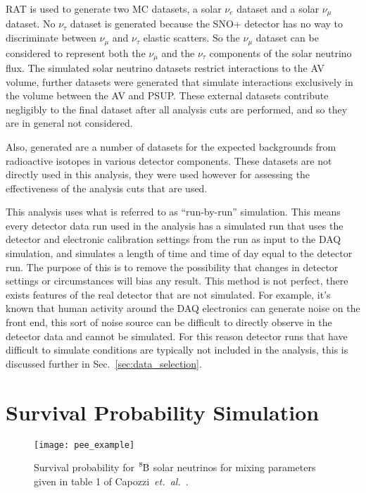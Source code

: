 RAT is used to generate two MC datasets, a solar $\nu_{e}$ dataset
and a solar $\nu_{\mu}$ dataset.
No $\nu_{\tau}$ dataset is generated because the SNO+ detector has
no way to discriminate between $\nu_{\mu}$ and $\nu_{\tau}$ elastic scatters.
So the $\nu_{\mu}$ dataset can be considered to represent both the $\nu_{\mu}$
and the $\nu_{\tau}$ components of the solar neutrino flux.
The simulated solar neutrino datasets restrict interactions to the AV volume,
further datasets were generated that simulate interactions exclusively in the
volume between the AV and PSUP\@.
These external datasets contribute negligibly to the final dataset after all
analysis cuts are performed, and so they are in general not considered.

Also, generated are a number of datasets for the expected backgrounds from
radioactive isotopes in various detector components.
These datasets are not directly used in this analysis, they were used however
for assessing the effectiveness of the analysis cuts that are used.

This analysis uses what is referred to as ``run-by-run'' simulation.
This means every detector data run used in the analysis has a simulated run that uses
the detector and electronic calibration settings from the run as input to the DAQ simulation, and simulates
a length of time and time of day equal to the detector run.
The purpose of this is to remove the possibility that changes in detector settings
or circumstances will bias any result.
This method is not perfect, there exists features of the real detector
that are not simulated.
For example, it's known that human activity around the DAQ electronics can generate
noise on the front end, this sort of noise source can be difficult to directly observe
in the detector data and cannot be simulated.
For this reason detector runs that have difficult to simulate conditions
are typically not included in the analysis, this is discussed further
in Sec.~\ref{sec:data_selection}.

\section{Survival Probability Simulation}
\label{sec:survival_prob}
\begin{figure}[htbp]
\centering
\texttt{[image: pee\_example]}
\caption[$\ce{^{8}B}$ Solar Neutrino Survival Probability]{
Survival probability for $\ce{^{8}B}$ solar neutrinos for mixing parameters
given in table 1 of Capozzi~\textit{et.\ al.}~\citep{pdg_globalfit}.
}
\label{fig:example_survival_prob}
\end{figure}

